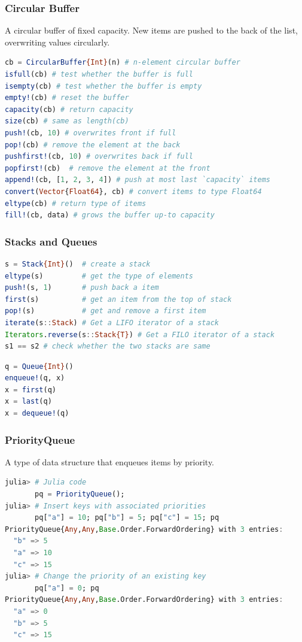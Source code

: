 \documentclass{beamer}
\begin{document}
\begin{frame}[fragile]
\frametitle{Circular Buffer}
A circular buffer of fixed capacity. New items are pushed to the back of the list, overwriting values circularly.
\begin{lstlisting}[language=julia]
cb = CircularBuffer{Int}(n) # n-element circular buffer
isfull(cb) # test whether the buffer is full
isempty(cb) # test whether the buffer is empty
empty!(cb) # reset the buffer
capacity(cb) # return capacity
size(cb) # same as length(cb)
push!(cb, 10) # overwrites front if full
pop!(cb) # remove the element at the back
pushfirst!(cb, 10) # overwrites back if full
popfirst!(cb)  # remove the element at the front
append!(cb, [1, 2, 3, 4]) # push at most last `capacity` items
convert(Vector{Float64}, cb) # convert items to type Float64
eltype(cb) # return type of items
fill!(cb, data) # grows the buffer up-to capacity
\end{lstlisting}
\end{frame}

\begin{frame}[fragile]
\frametitle{Stacks and Queues}
\begin{lstlisting}[language=julia]
s = Stack{Int}()  # create a stack
eltype(s)         # get the type of elements
push!(s, 1)       # push back a item
first(s)          # get an item from the top of stack
pop!(s)           # get and remove a first item
iterate(s::Stack) # Get a LIFO iterator of a stack
Iterators.reverse(s::Stack{T}) # Get a FILO iterator of a stack
s1 == s2 # check whether the two stacks are same
\end{lstlisting}
\begin{lstlisting}[language=julia]
q = Queue{Int}()
enqueue!(q, x)
x = first(q)
x = last(q)
x = dequeue!(q)
\end{lstlisting}
\end{frame}

\begin{frame}[fragile]
\frametitle{PriorityQueue}
A type of data structure that enqueues items by priority.
\begin{lstlisting}[language=julia]
julia> # Julia code
       pq = PriorityQueue();
julia> # Insert keys with associated priorities
       pq["a"] = 10; pq["b"] = 5; pq["c"] = 15; pq
PriorityQueue{Any,Any,Base.Order.ForwardOrdering} with 3 entries:
  "b" => 5
  "a" => 10
  "c" => 15
julia> # Change the priority of an existing key
       pq["a"] = 0; pq
PriorityQueue{Any,Any,Base.Order.ForwardOrdering} with 3 entries:
  "a" => 0
  "b" => 5
  "c" => 15
\end{lstlisting}
\end{frame}
\end{document}
